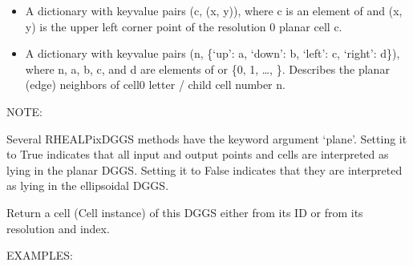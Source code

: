 \documentclass[a4paper,12ptopenany,oneside,english]{sphinxmanual}
\begin{document}
\begin{fulllineitems}
\begin{itemize}
\item {} 
\sphinxAtStartPar
{} \sphinxhyphen{} A dictionary with key\sphinxhyphen{}value pairs (c, (x, y)), where
c is an element of  and (x, y) is the upper left corner point
of the resolution 0 planar cell c.

\item {} 
\sphinxAtStartPar
{} \sphinxhyphen{} A dictionary with key\sphinxhyphen{}value pairs
(n, \{‘up’: a, ‘down’: b, ‘left’: c, ‘right’: d\}),
where n, a, b, c, and d are elements of  or
\{0, 1, …, \}.
Describes the planar (edge) neighbors of cell0 letter / child cell number
n.

\end{itemize}

\sphinxAtStartPar
NOTE:

\sphinxAtStartPar
Several RHEALPixDGGS methods have the keyword argument ‘plane’.
Setting it to True indicates that all input and output points and cells are
interpreted as lying in the planar DGGS.
Setting it to False indicates that they are interpreted as lying in
the ellipsoidal DGGS.

\begin{fulllineitems}
\label{\detokenize{dggs:rhealpixdggs.dggs.RHEALPixDGGS.cell}}
\pysigstartsignatures
{}
\pysigstopsignatures
\sphinxAtStartPar
Return a cell (Cell instance) of this DGGS either from its ID or
from its resolution and index.

\sphinxAtStartPar
EXAMPLES:

\begin{sphinxVerbatim}[commandchars=\\\{\}]
  
    
 
\end{sphinxVerbatim}


\end{fulllineitems}
\end{fulllineitems}
\end{document}
